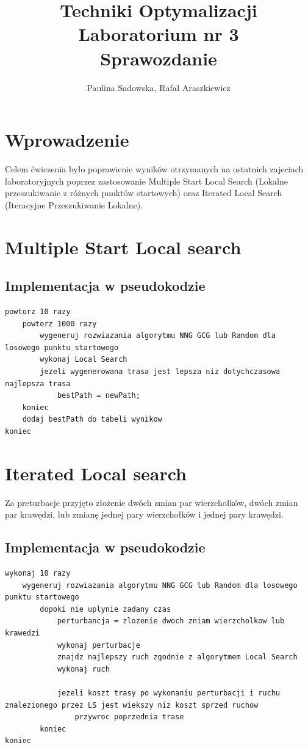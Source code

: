 \documentclass[a4paper 10pt]{article}
\title{\textbf{Techniki Optymalizacji} \\
Laboratorium nr 3 \\
Sprawozdanie}
\author{Paulina Sadowska, Rafał Araszkiewicz}
\begin{document}
\maketitle

\section{Wprowadzenie}
Celem ćwiczenia było poprawienie wyników otrzymanych na ostatnich zajeciach  laboratoryjnych poprzez zastosowanie Multiple Start Local Search (Lokalne przeszukiwanie z różnych punktów startowych) oraz Iterated Local Search (Iteracyjne Przeszukiwanie Lokalne).
\section{Multiple Start Local search}
\label{Multiple Start Local search}
\subsection{Implementacja w pseudokodzie}
\begin{lstlisting}[frame=single]
powtorz 10 razy
	powtorz 1000 razy
		wygeneruj rozwiazania algorytmu NNG GCG lub Random dla losowego punktu startowego
		wykonaj Local Search
		jezeli wygenerowana trasa jest lepsza niz dotychczasowa najlepsza trasa
			bestPath = newPath;
	koniec
	dodaj bestPath do tabeli wynikow
koniec

\end{lstlisting}

\section{Iterated Local search}
\label{Iterated Local search}
Za preturbacje przyjęto złożenie dwóch zmian par wierzchołków, dwóch zmian par krawędzi, lub zmianę jednej pary wierzchołków i jednej pary krawędzi.
\subsection{Implementacja w pseudokodzie}
\begin{lstlisting}[frame=single]
wykonaj 10 razy
	wygeneruj rozwiazania algorytmu NNG GCG lub Random dla losowego punktu startowego
		dopoki nie uplynie zadany czas
			perturbancja = zlozenie dwoch zniam wierzcholkow lub krawedzi
			wykonaj perturbacje
			znajdz najlepszy ruch zgodnie z algorytmem Local Search
			wykonaj ruch
			
			jezeli koszt trasy po wykonaniu perturbacji i ruchu znalezionego przez LS jest wiekszy niz koszt sprzed ruchow
				przywroc poprzednia trase
		koniec
koniec
\end{lstlisting}
\end{document}
